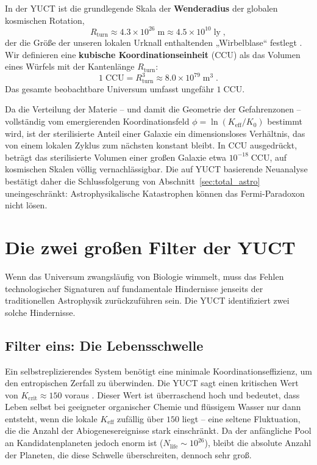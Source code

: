 \documentclass[11pt,a4paper]{article}
\newcommand{\Keff}{K_{\mathrm{eff}}}
\newcommand{\CCU}{\text{CCU}}
\begin{document}
	In der YUCT ist die grundlegende Skala der \textbf{Wenderadius} der globalen kosmischen Rotation,
	\begin{equation}
		R_{\mathrm{turn}} \approx 4.3\times 10^{26}\;\mathrm{m}
		\approx 4.5\times 10^{10}\;\mathrm{ly}\; ,
	\end{equation}
	der die Größe der unseren lokalen Urknall enthaltenden „Wirbelblase“ festlegt \citep{AppOmega}. Wir definieren eine \textbf{kubische Koordinationseinheit} (CCU) als das Volumen eines Würfels mit der Kantenlänge \(R_{\mathrm{turn}}\):
	\begin{equation}
		1\;\CCU = R_{\mathrm{turn}}^{3} \approx 8.0\times 10^{79}\;\mathrm{m}^{3}\; .
	\end{equation}
	Das gesamte beobachtbare Universum umfasst ungefähr \(1\;\CCU\).
	
	Da die Verteilung der Materie – und damit die Geometrie der Gefahrenzonen – vollständig vom emergierenden Koordinationsfeld \(\phi = \ln(\Keff/K_{0})\) bestimmt wird, ist der sterilisierte Anteil einer Galaxie ein dimensionsloses Verhältnis, das von einem lokalen Zyklus zum nächsten konstant bleibt. In CCU ausgedrückt, beträgt das sterilisierte Volumen einer großen Galaxie etwa \(10^{-18}\;\CCU\), auf kosmischen Skalen völlig vernachlässigbar. Die auf YUCT basierende Neuanalyse bestätigt daher die Schlussfolgerung von Abschnitt~\ref{sec:total_astro} uneingeschränkt: Astrophysikalische Katastrophen können das Fermi-Paradoxon nicht lösen.
	
	\section{Die zwei großen Filter der YUCT}
	\label{sec:yuct_filters}
	Wenn das Universum zwangsläufig von Biologie wimmelt, muss das Fehlen technologischer Signaturen auf fundamentale Hindernisse jenseits der traditionellen Astrophysik zurückzuführen sein. Die YUCT identifiziert zwei solche Hindernisse.
	
	\subsection{Filter eins: Die Lebensschwelle}
	\label{sec:filter1}
	Ein selbstreplizierendes System benötigt eine minimale Koordinationseffizienz, um den entropischen Zerfall zu überwinden. Die YUCT sagt einen kritischen Wert von \(K_{\mathrm{crit}}\approx 150\) voraus \citep{AppT}. Dieser Wert ist überraschend hoch und bedeutet, dass Leben selbst bei geeigneter organischer Chemie und flüssigem Wasser nur dann entsteht, wenn die lokale \(K_{\mathrm{eff}}\) zufällig über \(150\) liegt – eine seltene Fluktuation, die die Anzahl der Abiogenesereignisse stark einschränkt. Da der anfängliche Pool an Kandidatenplaneten jedoch enorm ist (\(N_{\mathrm{life}}\sim 10^{26}\)), bleibt die absolute Anzahl der Planeten, die diese Schwelle überschreiten, dennoch sehr groß.
	
\end{document}
